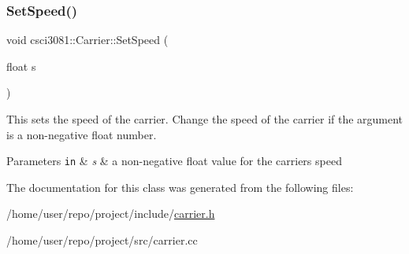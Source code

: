 \subsubsection{\texorpdfstring{Set\+Speed()}{SetSpeed()}}
{\footnotesize\ttfamily void csci3081\+::\+Carrier\+::\+Set\+Speed (\begin{DoxyParamCaption}\item[{float}]{s }\end{DoxyParamCaption})}



This sets the speed of the carrier. Change the speed of the carrier if the argument is a non-\/negative float number. 


\begin{DoxyParams}[1]{Parameters}
\mbox{\tt in}  & {\em s} & a non-\/negative float value for the carrier\textquotesingle{}s speed \\
\hline
\end{DoxyParams}


The documentation for this class was generated from the following files\+:\begin{DoxyCompactItemize}
\item 
/home/user/repo/project/include/\hyperlink{carrier_8h}{carrier.\+h}\item 
/home/user/repo/project/src/carrier.\+cc\end{DoxyCompactItemize}
